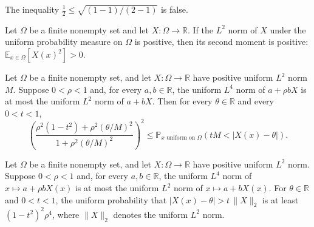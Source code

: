 \begin{theorem}
\label{FABL.exercise9_10_nonzero_hypothesis_necessary}
\leanok
{}
The inequality $\frac12\le\sqrt{(1-1)/(2-1)}$ is false.
\end{theorem}

\begin{theorem}
\label{FABL.expect_sq_pos_of_uniformLpNorm_two_pos}
\leanok
{}
Let $\Omega$ be a finite nonempty set and let $X\colon\Omega\to\mathbb{R}$. If the $L^2$
norm of $X$ under the uniform probability measure on $\Omega$ is positive, then its
second moment is positive: $\mathbb{E}_{x\in\Omega}[X(x)^2]>0$.
\end{theorem}

\begin{theorem}
\label{FABL.translated_anticoncentration_exact_of_hypercontractive}
\leanok
{}
Let $\Omega$ be a finite nonempty set, and let $X:\Omega\to\mathbb R$ have positive
uniform $L^2$ norm $M$. Suppose $0<\rho<1$ and, for every $a,b\in\mathbb R$, the uniform
$L^4$ norm of $a+\rho bX$ is at most the uniform $L^2$ norm of $a+bX$. Then for every
$\theta\in\mathbb R$ and every $0<t<1$,
\[
\left(\frac{\rho^2(1-t^2)+\rho^2(\theta/M)^2}{1+\rho^2(\theta/M)^2}\right)^2
\leq \mathbb P_{x\text{ uniform on }\Omega}\!\left(tM<|X(x)-\theta|\right).
\]
\end{theorem}

\begin{theorem}
\label{FABL.translated_anticoncentration_of_hypercontractive}
\leanok
{}
Let $\Omega$ be a finite nonempty set, and let $X:\Omega\to\mathbb R$ have positive
uniform $L^2$ norm. Suppose $0<\rho<1$ and, for every $a,b\in\mathbb R$, the uniform
$L^4$ norm of $x\mapsto a+\rho bX(x)$ is at most the uniform $L^2$ norm of $x\mapsto
a+bX(x)$. For $\theta\in\mathbb R$ and $0<t<1$, the uniform probability that
$|X(x)-\theta|>t\,\|X\|_2$ is at least $(1-t^2)^2\rho^4$, where $\|X\|_2$ denotes the
uniform $L^2$ norm.
\end{theorem}
